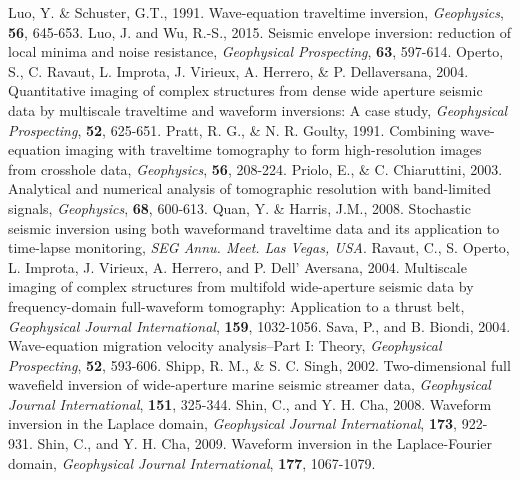 \documentclass[mreferee]{gji}
\begin{document}
\begin{thebibliography}{}
   Luo, Y. \& Schuster, G.T., 1991. Wave-equation traveltime inversion, \textit{Geophysics}, \textbf{56}, 645-653.
 Luo, J. and Wu, R.-S., 2015. Seismic envelope inversion: reduction of local minima and noise resistance, \textit{Geophysical Prospecting}, \textbf{63}, 597-614.
 Operto, S., C. Ravaut, L. Improta, J. Virieux, A. Herrero, \& P. Dellaversana, 2004. Quantitative imaging of complex structures from dense wide aperture seismic data by multiscale traveltime and waveform inversions: A case study, \textit{Geophysical Prospecting}, \textbf{52}, 625-651.
 Pratt, R. G., \& N. R. Goulty, 1991. Combining wave-equation imaging with traveltime tomography to form high-resolution images from crosshole data, \textit{Geophysics}, \textbf{56}, 208-224.
 Priolo, E., \& C. Chiaruttini, 2003. Analytical and numerical analysis of tomographic resolution with band-limited signals, \textit{Geophysics}, \textbf{68}, 600-613.
 Quan, Y. \& Harris, J.M., 2008. Stochastic seismic inversion using both waveformand traveltime data and its application to time-lapse monitoring, \textit{SEG Annu. Meet. Las Vegas, USA}.
 Ravaut, C., S. Operto, L. Improta, J. Virieux, A. Herrero, and P. Dell' Aversana, 2004. Multiscale imaging of complex structures from multifold wide-aperture seismic data by frequency-domain full-waveform tomography: Application to a thrust belt, \textit{Geophysical Journal International}, \textbf{159}, 1032-1056.
 Sava, P., and B. Biondi, 2004. Wave-equation migration velocity analysis--Part I: Theory, \textit{Geophysical Prospecting}, \textbf{52}, 593-606.
 Shipp, R. M., \& S. C. Singh, 2002. Two-dimensional full wavefield inversion of wide-aperture marine seismic streamer data, \textit{Geophysical Journal International}, \textbf{151}, 325-344.
 Shin, C., and Y. H. Cha, 2008. Waveform inversion in the Laplace domain, \textit{Geophysical Journal International}, \textbf{173}, 922-931.
 Shin, C., and Y. H. Cha, 2009. Waveform inversion in the Laplace-Fourier domain, \textit{Geophysical Journal International}, \textbf{177}, 1067-1079.

\end{thebibliography}
\end{document}
